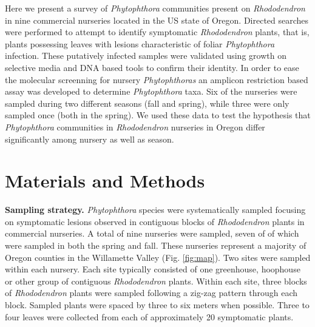 \documentclass[12pt]{article}
\begin{document}
Here we present a survey of \emph{Phytophthora} communities present on \emph{Rhododendron} in nine commercial nurseries located in the US state of Oregon.  Directed searches were performed to attempt to identify symptomatic \emph{Rhododendron} plants, that is, plants possessing leaves with lesions characteristic of foliar \emph{Phytophthora} infection.  These putatively infected samples were validated using growth on selective media and DNA based tools to confirm their identity.  In order to ease the molecular screenning for nursery \emph{Phytophthoras} an amplicon restriction based assay was developed to determine \emph{Phytophthora} taxa.  Six of the nurseries were sampled during two different seasons (fall and spring), while three were only sampled once (both in the spring).  We used these data to test the hypothesis that \emph{Phytophthora} communities in \emph{Rhododendron} nurseries in Oregon differ significantly among nursery as well as season.


\section*{\sffamily\normalsize{Materials and Methods}}


\textbf{Sampling strategy.} \emph{Phytophthora} species were systematically sampled focusing on symptomatic lesions observed in contiguous blocks of \emph{Rhododendron} plants in commercial nurseries.  A total of nine nurseries were sampled, seven of of which were sampled in both  the spring and fall.  These nurseries represent a majority of Oregon counties in the Willamette Valley (Fig. \ref{fig:map}).  Two sites were sampled within each nursery.  Each site typically consisted of one greenhouse, hoophouse or other group of contiguous \emph{Rhododendron} plants.  Within each site, three blocks of \emph{Rhododendron} plants were sampled following a zig-zag pattern through each block.  Sampled plants were spaced by three to six meters when possible.  Three to four leaves were collected from each of approximately 20 symptomatic plants.
\end{document}
